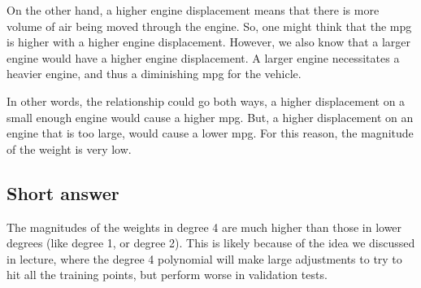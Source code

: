 \documentclass[12pt]{article}
\begin{document}
On the other hand, a higher engine displacement means that there is more volume
of air being moved through the engine. So, one might think that the mpg is
higher with a higher engine displacement. However, we also know that a larger
engine would have a higher engine displacement. A larger engine necessitates a heavier
engine, and thus a diminishing mpg for the vehicle. 

In other words, the relationship could go both ways, a higher displacement on a
small enough engine would cause a higher mpg. But, a higher displacement on an
engine that is too large, would cause a lower mpg. For this reason, the
magnitude of the weight is very low.
\subsection{Short answer}
The magnitudes of the weights in degree 4 are much higher than those in lower
degrees (like degree 1, or degree 2). This is likely because of the idea we
discussed in lecture, where the degree 4 polynomial will make large adjustments
to try to hit all the training points, but perform worse in validation tests. 
\end{document}
